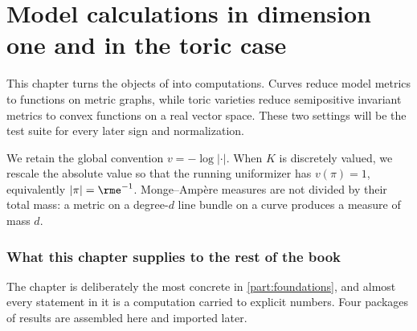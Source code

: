 \chapter{Model calculations in dimension one and in the toric case}
\label{chap:model-calculations}

This chapter turns the objects of
 into computations.  Curves
reduce model metrics to functions on metric graphs, while toric varieties
reduce semipositive invariant metrics to convex functions on a real vector space.  These
two settings will be the test suite for every later sign and normalization.

We retain the global convention $v=-\log|\cdot|$.  When $K$ is discretely
valued, we rescale the absolute value so that the running uniformizer has
$v(\pi)=1$, equivalently $|\pi|=\rme^{-1}$.  Monge--Amp\`ere
measures are not divided by their total mass: a metric on a degree-$d$ line
bundle on a curve produces a measure of mass $d$.

\subsection*{What this chapter supplies to the rest of the book}

The chapter is deliberately the most concrete in \cref{part:foundations}, and
almost every statement in it is a computation carried to explicit numbers.
Four packages of results are assembled here and imported later.

